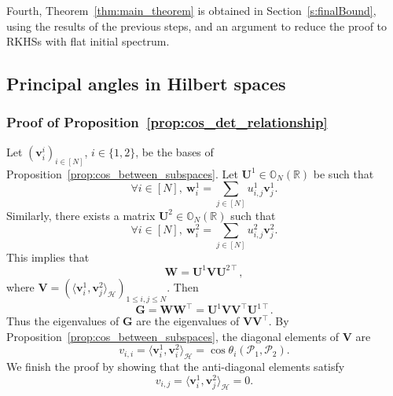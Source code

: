 \documentclass[twoside,11pt]{book}
\numberwithin{theorem}{chapter}
\numberwithin{definition}{chapter}
\numberwithin{proposition}{chapter}
\numberwithin{corollary}{chapter}
\numberwithin{example}{chapter}
\numberwithin{lemma}{chapter}
\DeclareMathOperator{\Tran}{\intercal}
\begin{document}
Fourth, Theorem~\ref{thm:main_theorem} is obtained in Section~\ref{s:finalBound}, using the results of the previous steps, and an argument to reduce the proof to RKHSs with flat initial spectrum.

\subsection{Principal angles in Hilbert spaces}\label{sec:proof_principal_angles}

\subsubsection{Proof of Proposition~\ref{prop:cos_det_relationship}}
Let $(\bm{v}^{i}_{i})_{i \in [N]}$, $i\in\{1,2\}$, be the bases of Proposition~\ref{prop:cos_between_subspaces}. Let $\bm{U}^{1} \in \mathbb{O}_{N}(\mathbb{R})$ be such that
\begin{equation}
\forall i \in [N], \: \bm{w}^{1}_{i} = \sum\limits_{j \in [N]} u^{1}_{i,j} \bm{v}^{1}_{j}.
\end{equation}
Similarly, there exists a matrix $\bm{U}^{2} \in \mathbb{O}_{N}(\mathbb{R})$ such that
\begin{equation}
\forall i \in [N], \: \bm{w}^{2}_{i} = \sum\limits_{j \in [N]} u^{2}_{i,j} \bm{v}^{2}_{j}.
\end{equation}
This implies that
\begin{equation}
\bm{W} = \bm{U}^{1}\bm{V}\bm{U}^{2 \Tran},
\end{equation}
where $\displaystyle \bm{V} = (\langle \bm{v}^{1}_{i}, \bm{v}^{2}_{j} \rangle_{\mathcal{H}})_{1 \leq i,j \leq N}$. Then
\begin{equation}
\bm{G} = \bm{W}\bm{W}^{\Tran} = \bm{U}^{1}\bm{V}\bm{V}^{\Tran}\bm{U}^{1 \Tran}.
\end{equation}
Thus the eigenvalues of $\bm{G}$ are the eigenvalues of $\bm{V}\bm{V}^{\Tran}$. By Proposition~\ref{prop:cos_between_subspaces}, the diagonal elements of $\bm{V}$ are
\begin{equation}\label{eq:diagonal_of_V}
v_{i,i} = \langle \bm{v}^{1}_{i}, \bm{v}^{2}_{i} \rangle_{\mathcal{H}} = \cos \theta_{i}(\mathcal{P}_{1},\mathcal{P}_{2}).
\end{equation}
We finish the proof by showing that the anti-diagonal elements satisfy
\begin{equation}\label{eq:anti_diagonal_of_V}
v_{i,j} = \langle \bm{v}^{1}_{i}, \bm{v}^{2}_{j} \rangle_{\mathcal{H}} = 0.
\end{equation}
\end{document}
